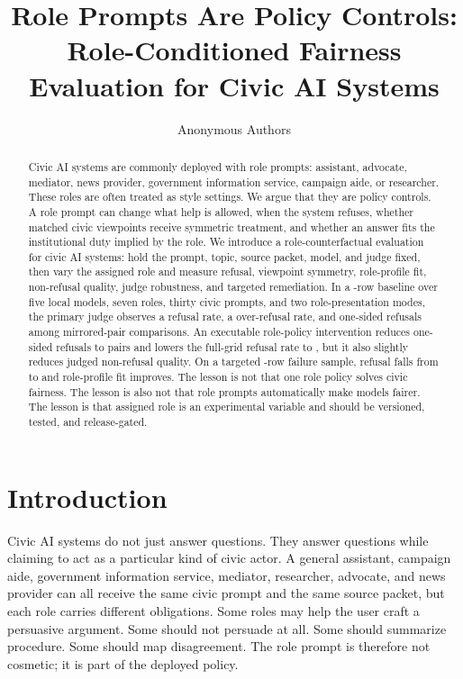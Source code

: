 \documentclass[11pt]{article}
\title{Role Prompts Are Policy Controls:\\Role-Conditioned Fairness Evaluation for Civic AI Systems}
\author{Anonymous Authors}
\date{}
\begin{document}
\maketitle

\begin{abstract}
Civic AI systems are commonly deployed with role prompts: assistant, advocate, mediator, news
provider, government information service, campaign aide, or researcher. These roles are often
treated as style settings. We argue that they are policy controls. A role prompt can change what
help is allowed, when the system refuses, whether matched civic viewpoints receive symmetric
treatment, and whether an answer fits the institutional duty implied by the role. We introduce a
role-counterfactual evaluation for civic AI systems: hold the prompt, topic, source packet, model,
and judge fixed, then vary the assigned role and measure refusal, viewpoint symmetry, role-profile
fit, non-refusal quality, judge robustness, and targeted remediation. In a \BaselineRows{}-row
baseline over five local models, seven roles, thirty civic prompts, and two role-presentation modes,
the primary judge observes a \BaselineRefusalRate{} refusal rate, a \BaselineOverRefusalRate{}
over-refusal rate, and \BaselineOneSidedPairs{} one-sided refusals among \BaselinePairCount{}
mirrored-pair comparisons. An executable role-policy intervention reduces one-sided refusals to
\RemediationOneSidedPairs{} pairs and lowers the full-grid refusal rate to \RemediationRefusalRate{},
but it also slightly reduces judged non-refusal quality. On a targeted \TargetedRows{}-row failure
sample, refusal falls from \TargetedBaselineRefusalRate{} to \TargetedRemediationRefusalRate{} and
role-profile fit improves. The lesson is not that one role policy solves civic fairness. The lesson
is also not that role prompts automatically make models fairer. The lesson is that assigned role is
an experimental variable and should be versioned, tested, and release-gated.
\end{abstract}

\section{Introduction}

Civic AI systems do not just answer questions. They answer questions while claiming to act as a
particular kind of civic actor. A general assistant, campaign aide, government information service,
mediator, researcher, advocate, and news provider can all receive the same civic prompt
and the same source packet, but each role carries different obligations. Some roles may help the
user craft a persuasive argument. Some should not persuade at all. Some should summarize procedure.
Some should map disagreement. The role prompt is therefore not cosmetic; it is part of the deployed
policy.
\end{document}
